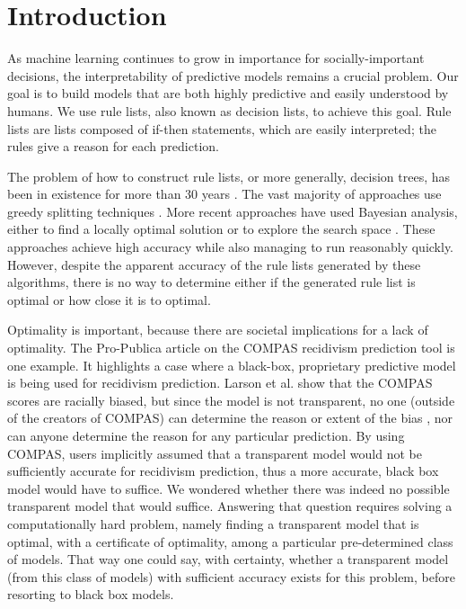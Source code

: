 %
%
%
%
%
%

\section{Introduction}

As machine learning continues to grow in importance for socially-important decisions, the interpretability of predictive models remains a crucial problem. Our goal is to build models that are both highly predictive and easily understood by humans. We use rule lists, also known as decision lists, to achieve this goal. Rule lists are lists composed of if-then statements, which are easily interpreted; the rules give a reason for each prediction.

The problem of how to construct rule lists, or more generally, decision trees, has been in existence for more than 30 years \cite{Rivest87,Breiman84,C5.0}. The vast majority of approaches use greedy splitting techniques \cite{Rivest87,Breiman84,C5.0,etc}. More recent approaches have used Bayesian analysis, either to find a locally optimal solution \cite{Chipman:1998jh} or to explore the search space \citep{LethamRuMcMa15, YangRuSe16}. These approaches achieve high accuracy while also managing to run reasonably quickly. However, despite the apparent accuracy of the rule lists generated by these algorithms, there is no way to determine either if the generated rule list is optimal or how close it is to optimal.

Optimality is important, because there are societal implications for a lack of optimality. The Pro-Publica article on the COMPAS recidivism prediction tool \citep{LarsonMaKiAn16} is one example. It highlights a case where a black-box, proprietary predictive model is being used for recidivism prediction. Larson et al. show that the COMPAS scores are racially biased, but since the model is not transparent, no one (outside of the creators of COMPAS) can determine the reason or extent of the bias \citep{LarsonMaKiAn16}, nor can anyone determine the reason for any particular prediction.
%
By using COMPAS, users implicitly assumed that a transparent model
would not be sufficiently accurate for recidivism prediction,
thus a more accurate, black box model would have to suffice.
%
We wondered whether there was indeed no possible transparent model that would suffice. Answering that question requires solving a computationally hard problem, namely finding a transparent model that is optimal, with a certificate of optimality, among a particular pre-determined class of models. That way one could say, with certainty, whether a transparent model (from this class of models) with sufficient accuracy exists for this problem, before resorting to black box models.

